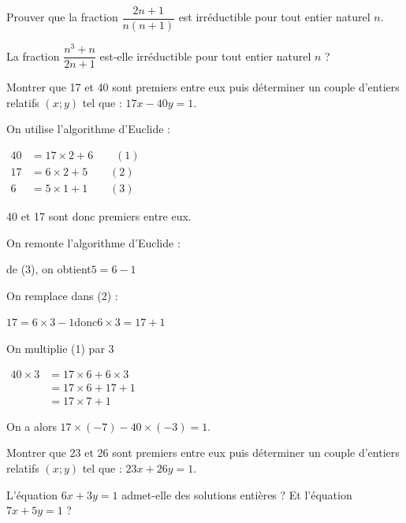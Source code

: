 \begin{colonne*exercice}
\begin{exercice}
Prouver que la fraction $\dfrac{2n+1}{n(n+1)}$ est irréductible pour tout entier naturel $n$.
\end{exercice}

\begin{exercice}
La fraction $\dfrac{n^3+n}{2n+1}$ est-elle irréductible pour tout entier naturel $n$ ?
\end{exercice}

\begin{exercice*}
\label{exo-sol_particuliere}
Montrer que 17 et 40 sont premiers entre eux puis déterminer un couple d’entiers relatifs $(x;y)$ tel que : $17x-40y= 1$.
\end{exercice*}
\begin{corrige}
  On utilise l'algorithme d'Euclide :

$\begin{aligned}
40&=17\times2+6\qquad (1)\\
17&=6\times2+5\qquad (2)\\
6&=5\times1+1\qquad (3)\end{aligned}$\medskip

40 et 17 sont donc premiers entre eux.\medskip

On remonte l'algorithme d'Euclide :

de (3), on obtient\enskip $5=6-1$\medskip

On remplace dans (2) :

$17=6\times3-1$\enskip donc\enskip $6\times3=17+1$\medskip

On multiplie (1) par 3

$\begin{aligned}
40\times3&=17\times6+6\times3\\
				 &=17\times6+17+1\\
				 &=17\times7+1\end{aligned}$\medskip
				
On a alors \enskip $17\times(-7)-40\times(-3)=1$.
\end{corrige}

\begin{exercice}
Montrer que 23 et 26 sont premiers entre eux puis déterminer un couple d'entiers relatifs $(x;y)$ tel que : $23x + 26y = 1$.
\end{exercice}

\begin{exercice}
L’équation $6x + 3y = 1$ admet-elle des solutions entières ? Et l'équation $7x + 5y = 1$ ?
\end{exercice}


\end{colonne*exercice}
